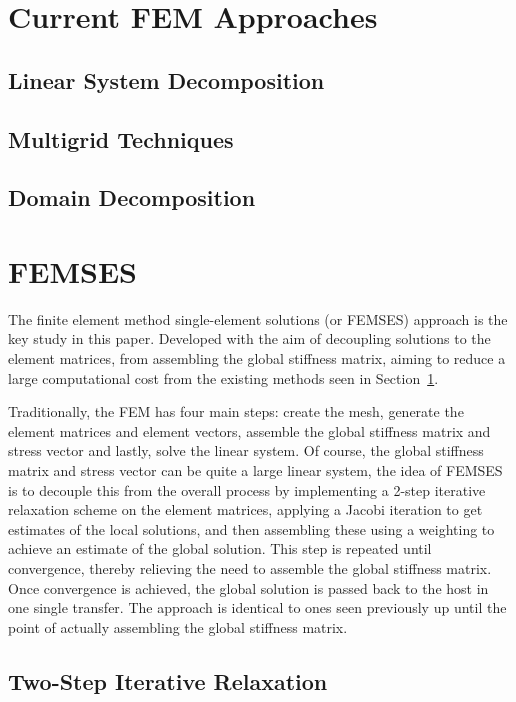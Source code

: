 \section{Current FEM Approaches}\label{approaches}

\subsection{Linear System Decomposition}

\subsection{Multigrid Techniques}

\subsection{Domain Decomposition}

\section{FEMSES}

The finite element method single-element solutions (or FEMSES) approach is the key study in this paper. Developed with the aim of decoupling solutions to the element matrices, from assembling the global stiffness matrix, aiming to reduce a large computational cost from the existing methods seen in Section~\ref{approaches}.

Traditionally, the FEM has four main steps: create the mesh, generate the element matrices and element vectors, assemble the global stiffness matrix and stress vector and lastly, solve the linear system. Of course, the global stiffness matrix and stress vector can be quite a large linear system, the idea of FEMSES is to decouple this from the overall process by implementing a 2-step iterative relaxation scheme on the element matrices, applying a Jacobi iteration to get estimates of the local solutions, and then assembling these using a weighting to achieve an estimate of the global solution. This step is repeated until convergence, thereby relieving the need to assemble the global stiffness matrix. Once convergence is achieved, the global solution is passed back to the host in one single transfer. The approach is identical to ones seen previously up until the point of actually assembling the global stiffness matrix.

\subsection{Two-Step Iterative Relaxation}

